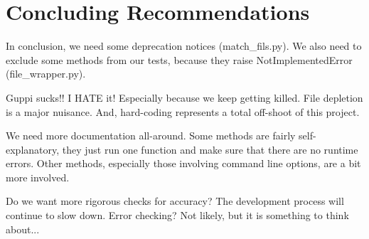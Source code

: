 \documentclass[12pt]{article}
\begin{document}
\section{Concluding Recommendations}

\quad \quad In conclusion, we need some deprecation notices (match\_fils.py). We also need to exclude some methods from our tests, because they raise NotImplementedError (file\_wrapper.py).

Guppi sucks!! I HATE it! Especially because we keep getting killed. File depletion is a major nuisance. And, hard-coding represents a total off-shoot of this project.

We need more documentation all-around. Some methods are fairly self-explanatory, they just run one function and make sure that there are no runtime errors. Other methods, especially those involving command line options, are a bit more involved.

Do we want more rigorous checks for accuracy? The development process will continue to slow down.
Error checking? Not likely, but it is something to think about...
\end{document}

